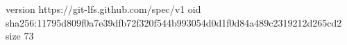 version https://git-lfs.github.com/spec/v1
oid sha256:11795d809f0a7e39dfb72f320f544b993054d0d1f0d84a489c2319212d265cd2
size 73

